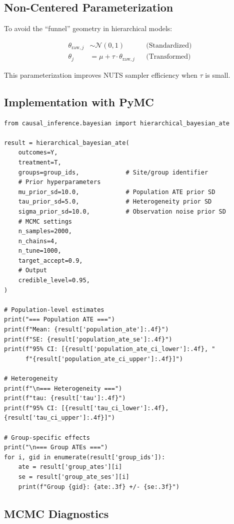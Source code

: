 \subsection{Non-Centered Parameterization}

To avoid the ``funnel'' geometry in hierarchical models:

\begin{align}
\theta_{\text{raw},j} &\sim \mathcal{N}(0, 1) && \text{(Standardized)} \\
\theta_j &= \mu + \tau \cdot \theta_{\text{raw},j} && \text{(Transformed)}
\end{align}

This parameterization improves NUTS sampler efficiency when $\tau$ is small.

\subsection{Implementation with PyMC}

\begin{verbatim}
from causal_inference.bayesian import hierarchical_bayesian_ate

result = hierarchical_bayesian_ate(
    outcomes=Y,
    treatment=T,
    groups=group_ids,             # Site/group identifier
    # Prior hyperparameters
    mu_prior_sd=10.0,             # Population ATE prior SD
    tau_prior_sd=5.0,             # Heterogeneity prior SD
    sigma_prior_sd=10.0,          # Observation noise prior SD
    # MCMC settings
    n_samples=2000,
    n_chains=4,
    n_tune=1000,
    target_accept=0.9,
    # Output
    credible_level=0.95,
)

# Population-level estimates
print("=== Population ATE ===")
print(f"Mean: {result['population_ate']:.4f}")
print(f"SE: {result['population_ate_se']:.4f}")
print(f"95% CI: [{result['population_ate_ci_lower']:.4f}, "
      f"{result['population_ate_ci_upper']:.4f}]")

# Heterogeneity
print(f"\n=== Heterogeneity ===")
print(f"tau: {result['tau']:.4f}")
print(f"95% CI: [{result['tau_ci_lower']:.4f}, {result['tau_ci_upper']:.4f}]")

# Group-specific effects
print("\n=== Group ATEs ===")
for i, gid in enumerate(result['group_ids']):
    ate = result['group_ates'][i]
    se = result['group_ate_ses'][i]
    print(f"Group {gid}: {ate:.3f} +/- {se:.3f}")
\end{verbatim}

\subsection{MCMC Diagnostics}

